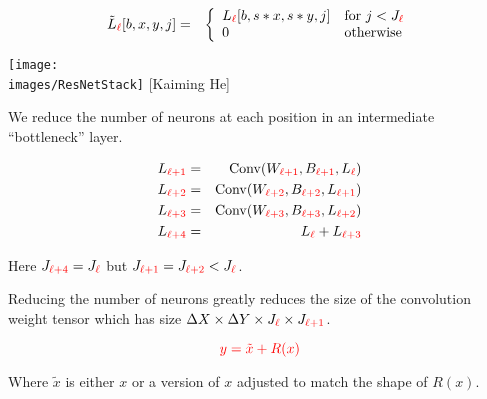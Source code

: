{\vfill
\begin{eqnarray*}
\tilde{L}_{\color{red} \ell}[b,x,y,j] & = & \left\{\begin{array}{ll} L_{\color{red} \ell}[b,s*x,s*y,j] & \mbox{for $j < J_{\color{red} \ell}$} \\ 0 & \mbox{otherwise} \end{array}\right.
\end{eqnarray*}




\centerline{\texttt{[image: \\images/ResNetStack]} {\large [Kaiming He]}}


We reduce the number of neurons at each position in an intermediate ``bottleneck'' layer.

\begin{eqnarray*}
L_{\color{red} \ell+1} & = & \mathrm{Conv}(W_{\color{red} \ell+1},B_{\color{red} \ell+1},L_{\color{red} \ell}) \\
L_{\color{red} \ell+2} & = & \mathrm{Conv}(W_{\color{red} \ell+2},B_{\color{red} \ell+2},L_{\color{red} \ell+1}) \\
L_{\color{red} \ell+3} & = & \mathrm{Conv}(W_{\color{red} \ell+3},B_{\color{red} \ell+3},L_{\color{red} \ell+2}) \\
L_{\color{red} \ell+4} & = & L_{\color{red} \ell} + L_{\color{red} \ell+3}
\end{eqnarray*}

\vfill
Here $J_{\color{red} \ell+4} = J_{\color{red} \ell}$ but $J_{\color{red} \ell+1} = J_{\color{red} \ell+2} < J_{\color{red} \ell}$.

\vfill
Reducing the number of neurons greatly reduces the size of the convolution weight tensor which has size $\Delta X \times \Delta Y \times J_{\color{red} \ell} \times J_{\color{red} \ell+1}$.


$${\color{red} y = \tilde{x} + R(x)}$$

\vfill
Where $\tilde{x}$ is either $x$ or a version of $x$ adjusted to match the shape of $R(x)$.

}
